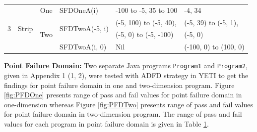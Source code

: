 \begin{table}[h]
{\begin{tabular}{|c|c|c|l|l|l|}
				



\multirow{5}{*}{3} 	&	\multirow{5}{*}{Strip}					& 	\multirow{2}{*}{One}			&	\multirow{2}{*}{SFDOneA(i)}	&	\multirow{2}{*}{-100 to -5, 35 to 100}		& 	\multirow{2}{*}{-4, 34	}\\ 
				&									&							&							&									&				\\  \cline{3-6}
				&									&	\multirow{3}{*}{Two}			&	\multirow{2}{*}{SFDTwoA(-5, i)}	&	(-5, 100) to (-5, 40),					&  (-5, 39) to (-5, 1), 			\\ 
				&									&							&							&	 (-5, 0) to (-5, -100)					&	(-5, 0)				\\ \cline{4-6}
				&									& 							&	SFDTwoA(i, 0)				&	Nil								&  (-100, 0) to (100, 0)			\\  \hline
				
				
\end{tabular}
}
\label{table:failtable}
\end{table}

\bigskip

\textbf{Point Failure Domain:}  Two separate Java programs \verb+Program1+ and \verb+Program2+, given in Appendix 1 (1, 2), were tested with ADFD strategy in YETI to get the findings for point failure domain in one and two-dimension program. Figure \ref{fig:PFDOne} presents range of pass and fail values for point failure domain in one-dimension whereas Figure \ref{fig:PFDTwo} presents range of pass and fail values for point failure domain in two-dimension program. The range of pass and fail values for each program in point failure domain is given in Table \ref{table:failtable}.

